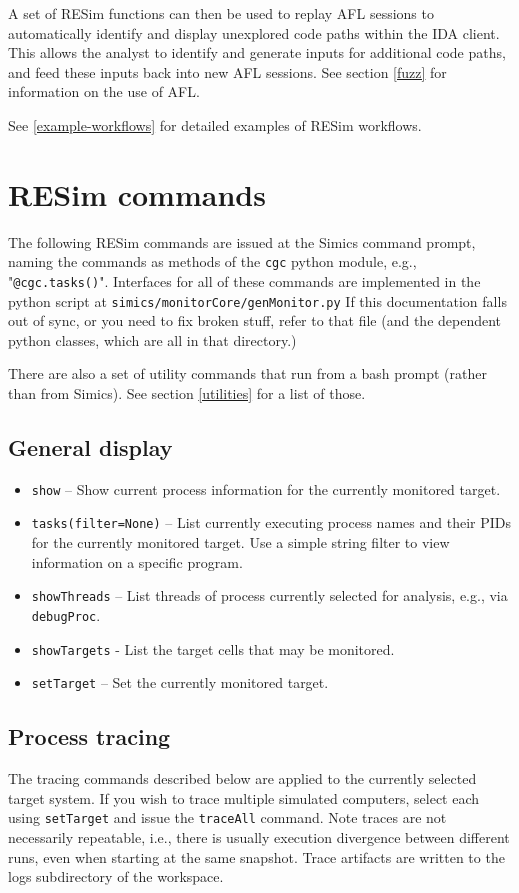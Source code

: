 \documentclass[titlepage]{article}
\begin{document}
A set of RESim functions can then be used to replay AFL sessions to automatically identify and display unexplored code paths within
the IDA client.  This allows the analyst to identify and generate inputs for additional code paths, and feed these inputs back into 
new AFL sessions.  See section \ref{fuzz} for information on the use of AFL.

See \ref{example-workflows} for detailed examples of RESim workflows.


\section{RESim commands}
\label{commands}
The following RESim commands are issued at the Simics command prompt, naming the commands as methods of the {\tt cgc} python module,
e.g., "{\tt @cgc.tasks()}".  Interfaces for all of these commands are implemented in the python script at {\tt simics/monitorCore/genMonitor.py}
If this documentation falls out of sync, or you need to fix broken stuff, refer to that file (and the dependent python classes, which are all in that directory.)

There are also a set of utility commands that run from a bash prompt (rather than from Simics).  See section \ref{utilities} for a list of those.

\label{commands}
\subsection{General display}
\begin{itemize}
\item {\tt show} -- Show current process information for the currently monitored target.
\item {\tt tasks(filter=None)} -- List currently executing process names and their PIDs for the currently monitored target. Use a simple string filter to view information on
a specific program.
\item {\tt showThreads} -- List threads of process currently selected for analysis, e.g., via {\tt debugProc}.
\item {\tt showTargets} - List the target cells that may be monitored.
\item {\tt setTarget} -- Set the currently monitored target.
\end{itemize}

\subsection{Process tracing}
\label{process_tracing}
The tracing commands described below are applied to the currently selected target system.  If you wish to trace multiple simulated computers, select
each using {\tt setTarget} and issue the {\tt traceAll} command.  Note traces are not necessarily repeatable, i.e., there is usually execution 
divergence between different runs, even when starting at the same snapshot.  Trace artifacts are written to the logs subdirectory of the workspace.
\end{document}

